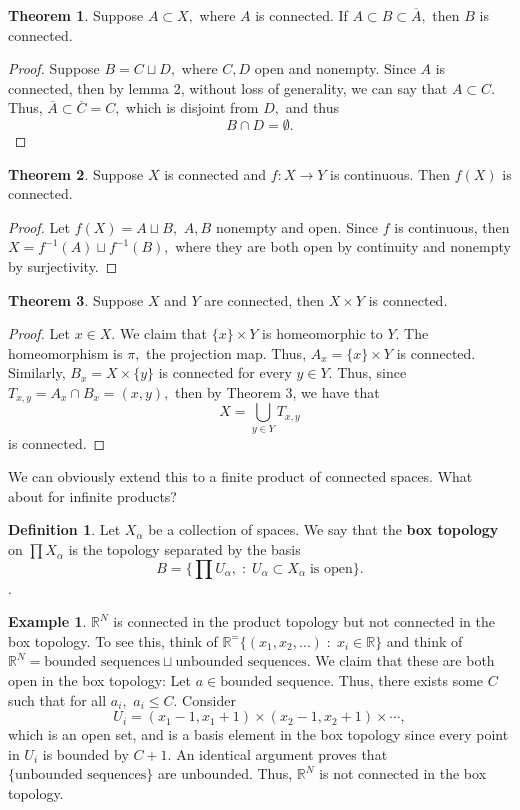 \documentclass[10pt, oneside]{article}
\newcommand{\bbR}{\mathbb{R}}
\theoremstyle{definition}
\newtheorem{exmp}{Example}[section]
\newtheorem{thm}{Theorem}
\newtheorem{defn}{Definition}
\begin{document}
\begin{thm}
    Suppose $A \subset X,$ where $A$ is connected. If $A\subset B \subset \overline{A},$ then $B$ is connected.
\end{thm}
\begin{proof}
    Suppose $B = C \sqcup D,$ where $C,D$ open and nonempty. Since $A$ is connected, then by lemma 2, without loss of generality, we can say that $A\subset C.$ Thus, $\overline{A}\subset \overline{C} = C,$ which is disjoint from $D,$ and thus 
    \[B \cap D = \emptyset.\]
\end{proof}
\begin{thm}
    Suppose $X$ is connected and $f: X\to Y$ is continuous. Then $f(X)$ is connected.
\end{thm}
\begin{proof}
    Let $f(X) = A\sqcup B,$ $A,B$ nonempty and open. Since $f$ is continuous, then $X = f^{-1}(A)\sqcup f^{-1}(B),$ where they are both open by continuity and nonempty by surjectivity.  
\end{proof}

\begin{thm}
    Suppose $X$ and $Y$ are connected, then $X \times Y$ is connected.
\end{thm}
\begin{proof}
    Let $x\in X.$ We claim that $\{x\}\times Y$ is homeomorphic to $Y.$ The homeomorphism is $\pi,$ the projection map. Thus, $A_x = \{x\}\times Y$ is connected. Similarly, $B_x = X \times \{y\}$ is connected for every $y \in Y.$ Thus, since $T_{x,y} = A_x \cap B_x = (x,y),$ then by Theorem 3, we have that 
    \[X = \bigcup_{y \in Y} T_{x,y}\] is connected.
\end{proof}
We can obviously extend this to a finite product of connected spaces. What about for infinite products?

\begin{defn}
    Let $X_\alpha$ be a collection of spaces. We say that the \textbf{box topology} on $\prod X_\alpha$ is the topology separated by the basis 
    \[B  = \{\prod U_\alpha, \; : \; U_\alpha \subset X_\alpha \; \text{is open}\}.\].
\end{defn}
\begin{exmp}
    $\bbR^N$ is connected in the product topology but not connected in the box topology. To see this, think of $\bbR^ = \{(x_1, x_2, \dots) \; : \; x_i \in \bbR\}$ and think of $\bbR^N = \text{bounded sequences} \sqcup \text{unbounded sequences}.$ We claim that these are both open in the box topology: Let $a \in \text{bounded sequence}.$ Thus, there exists some $C$ such that for all $a_i,$ $a_i \leq C.$ Consider 
    \[U_i = (x_1 - 1, x_1 + 1)\times (x_2 - 1, x_2 + 1)\times \cdots,\] which is an open set, and is a basis element in the box topology since every point in $U_i$ is bounded by $C + 1.$ An identical argument proves that $\{\text{unbounded sequences}\}$ are unbounded. Thus, $\bbR^N$ is not connected in the box topology. 
\end{exmp}
\end{document}
